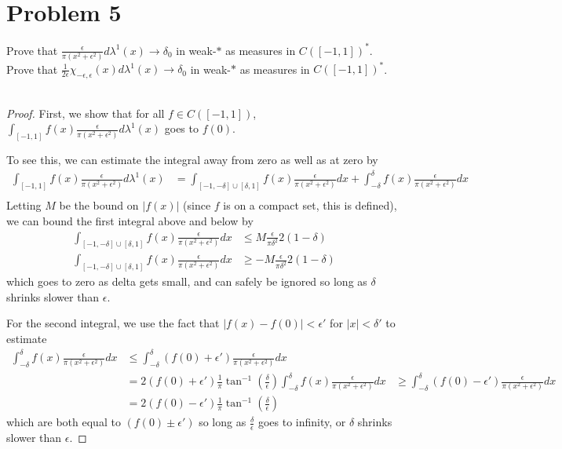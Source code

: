 \documentclass[fontsize=11pt]{scrartcl} %
\numberwithin{equation}{section} %
\numberwithin{figure}{section} %
\numberwithin{table}{section} %
\begin{document}
\section*{Problem 5}
Prove that $\frac{\epsilon}{\pi(x^2+\epsilon^2)}d\lambda^1(x)\to\delta_0$ in
weak-$*$ as
measures in $C([-1,1])^*$.
Prove that
$\frac{1}{2\epsilon}\chi_{-\epsilon,\epsilon}(x)d\lambda^1(x)\to\delta_0$ in
weak-$*$ as measures in $C([-1,1])^*$.
\\
\\
\begin{proof}
    First, we show that for all $f\in C([-1,1])$,
    $\int_{[-1,1]}f(x)\frac{\epsilon}{\pi(x^2+\epsilon^2)}d\lambda^1(x)$ goes to
    $f(0)$.

    To see this, we can estimate the integral away from zero as well as at zero
    by
    \[
        \begin{aligned}
            \int_{[-1,1]}f(x)\frac{\epsilon}{\pi(x^2+\epsilon^2)}d\lambda^1(x)
            &= \int_{[-1,-\delta]\cup[\delta,1]}
            f(x)\frac{\epsilon}{\pi(x^2+\epsilon^2)}dx + \int_{-\delta}^{\delta}
            f(x)\frac{\epsilon}{\pi(x^2+\epsilon^2)}dx\\
        \end{aligned}
    \]
    Letting $M$ be the bound on $|f(x)|$ (since $f$ is on a compact set, this is
    defined), we can bound the first integral above and below by
    \[
        \begin{aligned}
            \int_{[-1,-\delta]\cup[\delta,1]}f(x)\frac{\epsilon}{\pi(x^2+\epsilon^2)}dx
            &\leq M\frac{\epsilon}{\pi\delta^2}2(1-\delta)\\
            \int_{[-1,-\delta]\cup[\delta,1]}f(x)\frac{\epsilon}{\pi(x^2+\epsilon^2)}dx
            &\geq -M\frac{\epsilon}{\pi\delta^2}2(1-\delta)
        \end{aligned}
    \]
    which goes to zero as delta gets small, and can safely be ignored so long as
    $\delta$ shrinks slower than $\epsilon$. 

    For the second integral, we use the fact that $|f(x)-f(0)| < \epsilon'$ for
    $|x|<\delta'$ to estimate
    \[
        \begin{aligned}
        \int_{-\delta}^{\delta}f(x)\frac{\epsilon}{\pi(x^2+\epsilon^2)}dx
        &\leq
        \int_{-\delta}^{\delta}(f(0)+\epsilon')\frac{\epsilon}{\pi(x^2+\epsilon^2)}dx\\
        &= 2(f(0)+\epsilon')\frac{1}{\pi}\tan^{-1}(\frac{\delta}{\epsilon})
        \int_{-\delta}^{\delta}f(x)\frac{\epsilon}{\pi(x^2+\epsilon^2)}dx
        &\geq
        \int_{-\delta}^{\delta}(f(0)-\epsilon')\frac{\epsilon}{\pi(x^2+\epsilon^2)}dx\\
        &= 2(f(0)-\epsilon')\frac{1}{\pi}\tan^{-1}(\frac{\delta}{\epsilon})
        \end{aligned}
    \]
    which are both equal to $(f(0)\pm\epsilon')$ so long as
    $\frac{\delta}{\epsilon}$ goes to infinity, or $\delta$ shrinks slower than
    $\epsilon$.


\end{proof}
\end{document}
